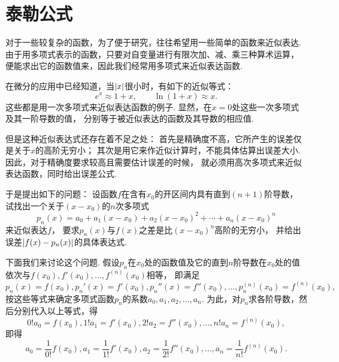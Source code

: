\section{泰勒公式}\label{section:微分中值定理.泰勒公式}
对于一些较复杂的函数，为了便于研究，往往希望用一些简单的函数来近似表达.
由于用多项式表示的函数，只要对自变量进行有限次加、减、乘三种算术运算，
便能求出它的函数值来，因此我们经常用多项式来近似表达函数.

在微分的应用中已经知道，当\(\abs{x}\)很小时，有如下的近似等式：\begin{equation*}
	e^x \approx 1+x, \qquad
	\ln(1+x) \approx x.
\end{equation*}
这些都是用一次多项式来近似表达函数的例子.
显然，在\(x=0\)处这些一次多项式及其一阶导数的值，
分别等于被近似表达的函数及其导数的相应值.

但是这种近似表达式还存在着不足之处：
首先是精确度不高，它所产生的误差仅是关于\(x\)的高阶无穷小；
其次是用它来作近似计算时，不能具体估算出误差大小.
因此，对于精确度要求较高且需要估计误差的时候，
就必须用高次多项式来近似表达函数，同时给出误差公式.

于是提出如下的问题：
设函数\(f\)在含有\(x_0\)的开区间内具有直到\((n+1)\)阶导数，
试找出一个关于\((x-x_0)\)的\(n\)次多项式\begin{equation*}
	p_n(x)
	= a_0 + a_1 (x-x_0) + a_2 (x-x_0)^2 + \dotsb + a_n (x-x_0)^n
\end{equation*}来近似表达\(f\)，
要求\(p_n(x)\)与\(f(x)\)之差是比\((x-x_0)^n\)高阶的无穷小，
并给出误差\(\abs{f(x) - p_n(x)}\)的具体表达式.

下面我们来讨论这个问题.
假设\(p_n\)在\(x_0\)处的函数值及它的直到\(n\)阶导数在\(x_0\)处的值
依次与\(f(x_0),f'(x_0),\dotsc,f^{(n)}(x_0)\)相等，
即满足\begin{equation*}
	p_n(x) = f(x_0),
	p_n'(x) = f'(x_0),
	p_n''(x) = f''(x_0),
	\dotsc,
	p_n^{(n)}(x_0) = f^{(n)}(x_0),
\end{equation*}
按这些等式来确定多项式函数\(p_n\)的系数\(a_0,a_1,a_2,\dotsc,a_n\).
为此，对\(p_n\)求各阶导数，然后分别代入以上等式，得\begin{equation*}
	0! a_0 = f(x_0),
	1! a_1 = f'(x_0),
	2! a_2 = f''(x_0),
	\dotsc,
	n! a_n = f^{(n)}(x_0),
\end{equation*}
即得\begin{equation*}
	a_0 = \frac1{0!} f(x_0),
	a_1 = \frac1{1!} f'(x_0),
	a_2 = \frac1{2!} f''(x_0),
	\dotsc,
	a_n = \frac1{n!} f^{(n)}(x_0).
\end{equation*}

